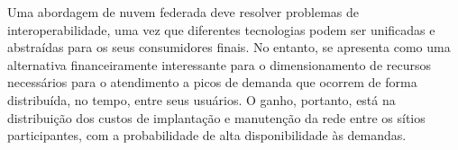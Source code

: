 \documentclass[tese,capa]{texufpel}
\begin{document}
Uma abordagem de nuvem federada deve resolver problemas de interoperabilidade, uma vez que diferentes tecnologias podem ser unificadas e abstraídas para os seus consumidores finais. No entanto, se apresenta como uma alternativa financeiramente interessante para o dimensionamento de recursos necessários para o atendimento a picos de demanda que ocorrem de forma distribuída, no tempo, entre seus usuários. O ganho, portanto, está na distribuição dos custos de implantação e manutenção da rede entre os sítios participantes, com a probabilidade de alta disponibilidade às demandas.



\end{document}
